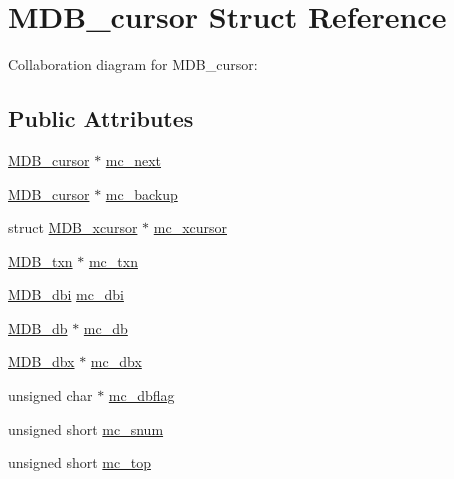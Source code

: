 \hypertarget{struct_m_d_b__cursor}{}\section{M\+D\+B\+\_\+cursor Struct Reference}
\label{struct_m_d_b__cursor}


Collaboration diagram for M\+D\+B\+\_\+cursor\+:
\subsection*{Public Attributes}
\begin{DoxyCompactItemize}
\item 
\mbox{\hyperlink{struct_m_d_b__cursor}{M\+D\+B\+\_\+cursor}} $\ast$ \mbox{\hyperlink{struct_m_d_b__cursor_a411862030a3c01cf536ec202c88b5b18}{mc\+\_\+next}}
\item 
\mbox{\hyperlink{struct_m_d_b__cursor}{M\+D\+B\+\_\+cursor}} $\ast$ \mbox{\hyperlink{struct_m_d_b__cursor_a128b96da79453c2cadfebe649094276f}{mc\+\_\+backup}}
\item 
struct \mbox{\hyperlink{struct_m_d_b__xcursor}{M\+D\+B\+\_\+xcursor}} $\ast$ \mbox{\hyperlink{struct_m_d_b__cursor_af7b8db7b9c6d16e437a4f2863059b560}{mc\+\_\+xcursor}}
\item 
\mbox{\hyperlink{struct_m_d_b__txn}{M\+D\+B\+\_\+txn}} $\ast$ \mbox{\hyperlink{struct_m_d_b__cursor_a15053edbec5a11acad196428db6604ed}{mc\+\_\+txn}}
\item 
\mbox{\hyperlink{group__mdb_gadbe68a06c448dfb62da16443d251a78b}{M\+D\+B\+\_\+dbi}} \mbox{\hyperlink{struct_m_d_b__cursor_a44eb2040bafbb4f0824ab42e36ffce50}{mc\+\_\+dbi}}
\item 
\mbox{\hyperlink{struct_m_d_b__db}{M\+D\+B\+\_\+db}} $\ast$ \mbox{\hyperlink{struct_m_d_b__cursor_a607ef0e65f7f18bbc0842dfd66e9ea73}{mc\+\_\+db}}
\item 
\mbox{\hyperlink{struct_m_d_b__dbx}{M\+D\+B\+\_\+dbx}} $\ast$ \mbox{\hyperlink{struct_m_d_b__cursor_ae47065c198fe591153cbcb6211e4b049}{mc\+\_\+dbx}}
\item 
unsigned char $\ast$ \mbox{\hyperlink{struct_m_d_b__cursor_a45bf21bcb00312d52c46f0b3b21e6858}{mc\+\_\+dbflag}}
\item 
unsigned short \mbox{\hyperlink{struct_m_d_b__cursor_adb751d5d6cf4135650fa2af70ec85b2e}{mc\+\_\+snum}}
\item 
unsigned short \mbox{\hyperlink{struct_m_d_b__cursor_a8c9f0954ac7f204e06c785b0b2b0a646}{mc\+\_\+top}}
\item 

\end{DoxyCompactItemize}
